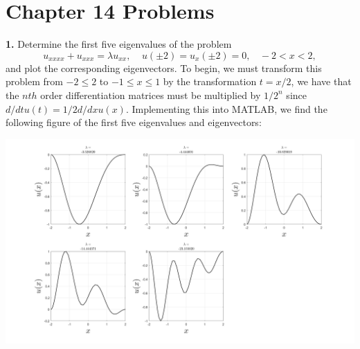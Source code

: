 \documentclass{article}
\begin{document}
\section*{Chapter 14 Problems}
\textbf{1.} Determine the first five eigenvalues of the problem
\[u_{xxxx} + u_{xxx} = \lambda u_{xx}, \:\:\:\:\: u(\pm 2) = u_x(\pm 2) = 0, \:\:\:\: -2 < x < 2,\]
and plot the corresponding eigenvectors. 
\newline\newline\newline
To begin, we must transform this problem from $-2 \leq 2$ to $-1 \leq x \leq 1$ by the transformation $t = x/2$, we have that the $nth$ order differentiation matrices must be multiplied by $1/2^n$ since $d/dt u(t) = 1/2d/dx u(x)$. Implementing this into MATLAB, we find the following figure of the first five eigenvalues and eigenvectors:
\begin{center}
    \includegraphics[scale = 0.3]{prob14_1_plot}
\end{center}
\end{document}
